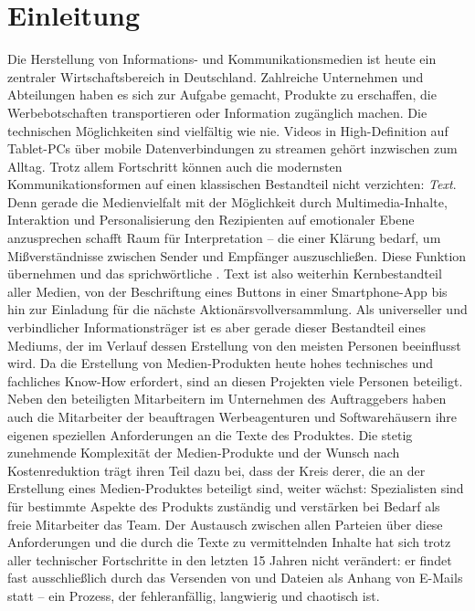 \section{Einleitung}

Die Herstellung von Informations- und Kommunikationsmedien ist heute ein zentraler Wirtschaftsbereich in Deutschland. Zahlreiche Unternehmen und Abteilungen haben es sich zur Aufgabe gemacht, Produkte zu erschaffen, die Werbebotschaften transportieren oder Information zugänglich machen. Die technischen Möglichkeiten sind vielfältig wie nie. Videos in High-Definition auf Tablet-PCs über mobile Datenverbindungen zu streamen gehört inzwischen zum Alltag. Trotz allem Fortschritt können auch die modernsten Kommunikationsformen auf einen klassischen Bestandteil nicht verzichten: \emph{Text}. Denn gerade die Medienvielfalt mit der Möglichkeit durch Multimedia-Inhalte, Interaktion und Personalisierung den Rezipienten auf emotionaler Ebene anzusprechen schafft Raum für Interpretation -- die einer Klärung bedarf, um Mißverständnisse zwischen Sender und Empfänger auszuschließen. Diese Funktion übernehmen  und das sprichwörtliche . Text ist also weiterhin Kernbestandteil aller Medien, von der Beschriftung eines Buttons in einer Smartphone-App bis hin zur Einladung für die nächste Aktionärsvollversammlung. Als universeller und verbindlicher Informationsträger ist es aber gerade dieser Bestandteil eines Mediums, der im Verlauf dessen Erstellung von den meisten Personen beeinflusst wird. Da die Erstellung von Medien-Produkten heute hohes technisches und fachliches Know-How erfordert, sind an diesen Projekten viele Personen beteiligt. Neben den beteiligten Mitarbeitern im Unternehmen des Auftraggebers haben auch die Mitarbeiter der beauftragen Werbeagenturen und Softwarehäusern ihre eigenen speziellen Anforderungen an die Texte des Produktes. Die stetig zunehmende Komplexität der Medien-Produkte und der Wunsch nach Kostenreduktion trägt ihren Teil dazu bei, dass der Kreis derer, die an der Erstellung eines Medien-Produktes beteiligt sind, weiter wächst: Spezialisten sind für bestimmte Aspekte des Produkts zuständig und verstärken bei Bedarf als freie Mitarbeiter das Team. Der Austausch zwischen allen Parteien über diese Anforderungen und die durch die Texte zu vermittelnden Inhalte hat sich trotz aller technischer Fortschritte in den letzten 15 Jahren nicht verändert: er findet fast ausschließlich durch das Versenden von  und Dateien als Anhang von E-Mails statt -- ein Prozess, der fehleranfällig, langwierig und chaotisch ist. 

